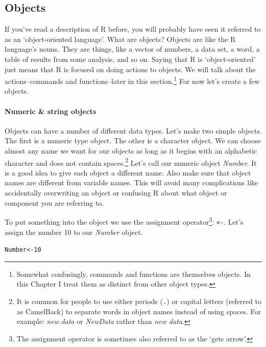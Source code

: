 \documentclass[krantz1]{krantz}
\begin{document}
\subsection{Objects}\label{Objects}

If you've read a description of R before, you will probably have seen it referred to as an `object-oriented language'.  What are objects? Objects are like the R language's nouns. They are things, like a vector of numbers, a data set, a word, a table of results from some analysis, and so on. Saying that R is `object-oriented' just means that R is focused on doing actions to objects. We will talk about the actions--commands and functions--later in this section.\footnote{Somewhat confusingly, commands and functions are themselves objects. In this Chapter I treat them as distinct from other object types.} For now let's create a few objects.

\paragraph{Numeric \& string objects}

Objects can have a number of different data types. Let's make two simple objects. The first is a numeric type object. The other is a character object. We can choose almost any name\label{ObjectNames} we want for our objects as long as it begins with an alphabetic character and does not contain spaces.\footnote{It is common for people to use either periods (\texttt{.}) or capital letters (referred to as CamelBack) to separate words in object names instead of using spaces. For example: {\emph{new.data}} or {\emph{NewData}} rather than {\emph{new data}}.} Let's call our numeric object {\emph{Number}}. It is a good idea to give each object a different name. Also make sure that object names are different from variable names. This will avoid many complications like accidentally overwriting an object or confusing R about what object or component you are referring to.

To put something into the object we use the assignment operator\footnote{The assignment operator is sometimes also referred to as the `gets arrow'.}: {\tt{\textless -}}. Let's assign the number 10 to our {\emph{Number}} object.

\begin{knitrout}
\color{fgcolor}\begin{kframe}
\begin{alltt}
Number <- 10
\end{alltt}
\end{kframe}
\end{knitrout}
\end{document}
